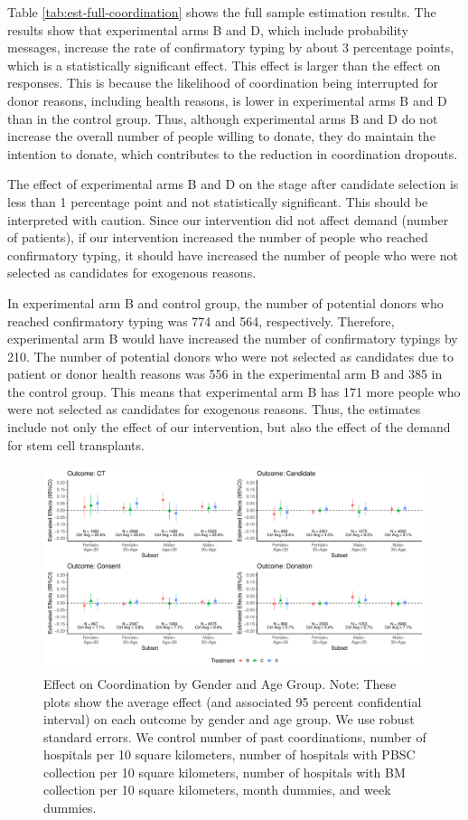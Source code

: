 \documentclass[
]{article}
\begin{document}
Table \ref{tab:est-full-coordination} shows the full sample estimation results. The results show that experimental arms B and D, which include probability messages, increase the rate of confirmatory typing by about 3 percentage points, which is a statistically significant effect. This effect is larger than the effect on responses. This is because the likelihood of coordination being interrupted for donor reasons, including health reasons, is lower in experimental arms B and D than in the control group. Thus, although experimental arms B and D do not increase the overall number of people willing to donate, they do maintain the intention to donate, which contributes to the reduction in coordination dropouts.

The effect of experimental arms B and D on the stage after candidate selection is less than 1 percentage point and not statistically significant. This should be interpreted with caution. Since our intervention did not affect demand (number of patients), if our intervention increased the number of people who reached confirmatory typing, it should have increased the number of people who were not selected as candidates for exogenous reasons.

In experimental arm B and control group, the number of potential donors who reached confirmatory typing was 774 and 564, respectively. Therefore, experimental arm B would have increased the number of confirmatory typings by 210. The number of potential donors who were not selected as candidates due to patient or donor health reasons was 556 in the experimental arm B and 385 in the control group. This means that experimental arm B has 171 more people who were not selected as candidates for exogenous reasons. Thus, the estimates include not only the effect of our intervention, but also the effect of the demand for stem cell transplants.

\begin{figure}[t]
\includegraphics{body_files/figure-latex/coefplot-reg-subsample-coordination-1} \caption{Effect on Coordination by Gender and Age Group. Note: These plots show the average effect (and associated 95 percent confidential interval) on each outcome by gender and age group. We use robust standard errors. We control number of past coordinations, number of hospitals per 10 square kilometers, number of hospitals with PBSC collection per 10 square kilometers, number of hospitals with BM collection per 10 square kilometers, month dummies, and week dummies.}\label{fig:coefplot-reg-subsample-coordination}
\end{figure}
\end{document}
